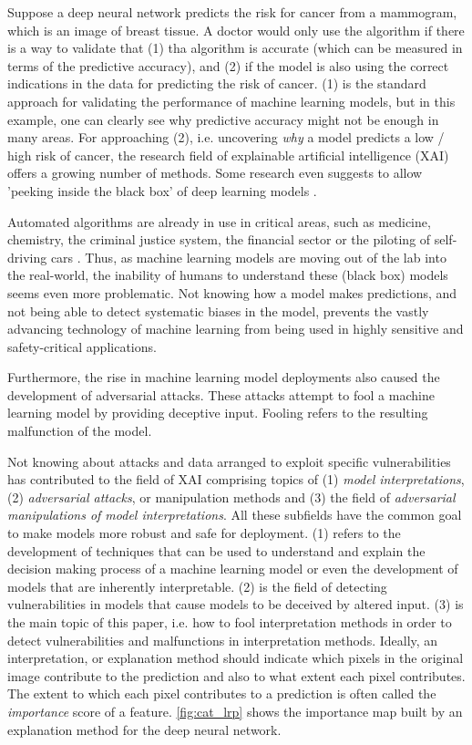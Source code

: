 Suppose a deep neural network predicts the risk for cancer from a mammogram, which is an image of breast tissue. A doctor would only use the algorithm if there is a way to validate that (1) tha algorithm is accurate (which can be measured in terms of the predictive accuracy), and (2) if the model is also using the correct indications in the data for predicting the risk of cancer. (1) is the standard approach for validating the performance of machine learning models, but in this example, one can clearly see why predictive accuracy might not be enough in many areas. For approaching (2), i.e. uncovering \textit{why} a model predicts a low / high risk of cancer, the research field of explainable artificial intelligence (XAI) offers a growing number of methods. Some research even suggests to allow 'peeking inside the black box' of deep learning models \cite{adadi2018peeking}.  

Automated algorithms are already in use in critical areas, such as medicine, chemistry, the criminal justice system, the financial sector or the piloting of self-driving cars \cite{chouldechova2017fair, elshawi2019interpretability, whitmore2016mapping}. %
Thus, as machine learning models are moving out of the lab into the real-world, the inability of humans to understand these (black box) models seems even more problematic. Not knowing how a model makes predictions, and not being able to detect systematic biases in the model, prevents the vastly advancing technology of machine learning from being used in highly sensitive and safety-critical applications.  

Furthermore, the rise in machine learning model deployments also caused the development of adversarial attacks. These attacks attempt to fool a machine learning model by providing deceptive input. Fooling refers to the resulting malfunction of the model. 

Not knowing about attacks and data arranged to exploit specific vulnerabilities has contributed to the field of XAI comprising topics of (1) \textit{model interpretations}, (2) \textit{adversarial attacks}, or manipulation methods and (3) the field of \textit{adversarial manipulations of model interpretations}. All these subfields have the common goal to make models more robust and safe for deployment. 
(1) refers to the development of techniques that can be used to understand and explain the decision making process of a machine learning model or even the development of models that are inherently interpretable. (2) is the field of detecting vulnerabilities in models that cause models to be deceived by altered input. 
(3) is the main topic of this paper, i.e. how to fool interpretation methods in order to detect vulnerabilities and malfunctions in interpretation methods. 
Ideally, an interpretation, or explanation method should indicate which pixels in the original image contribute to the prediction and also to what extent each pixel contributes. The extent to which each pixel contributes to a prediction is often called the \textit{importance} score of a feature. 
\autoref{fig:cat_lrp} shows the importance map built by an explanation method for the deep neural network.

